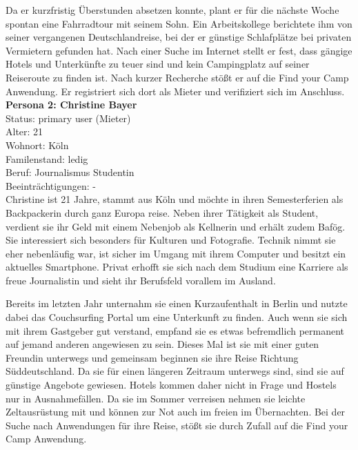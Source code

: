 Da er kurzfristig Überstunden absetzen konnte, plant er für die nächste Woche spontan eine Fahrradtour mit seinem Sohn. Ein Arbeitskollege berichtete ihm von seiner vergangenen Deutschlandreise, bei der er günstige Schlafplätze bei privaten Vermietern gefunden hat. Nach einer Suche im Internet stellt er fest, dass gängige Hotels und Unterkünfte zu teuer sind und kein Campingplatz auf seiner Reiseroute zu finden ist. Nach kurzer Recherche stößt er auf die Find your Camp Anwendung. Er registriert sich dort als Mieter und verifiziert sich im Anschluss.\\




\textbf{Persona 2: Christine Bayer }\\
Status: primary user (Mieter)\\

Alter: 21\\
Wohnort: Köln\\
Familenstand: ledig\\
Beruf: Journalismus Studentin\\
Beeinträchtigungen: - \\

Christine ist 21 Jahre, stammt aus Köln und möchte in ihren Semesterferien als Backpackerin durch ganz Europa reise.
Neben ihrer Tätigkeit als Student, verdient sie ihr Geld mit einem Nebenjob als Kellnerin und erhält zudem Bafög.
Sie interessiert sich besonders für Kulturen und Fotografie. Technik nimmt sie eher nebenläufig war, ist sicher im Umgang mit ihrem Computer und besitzt ein aktuelles Smartphone.
Privat erhofft sie sich nach dem Studium eine Karriere als freue Journalistin und sieht ihr Berufsfeld vorallem im Ausland.

Bereits im letzten Jahr unternahm sie einen Kurzaufenthalt in Berlin und nutzte dabei das Couchsurfing Portal um eine Unterkunft zu finden. Auch wenn sie sich mit ihrem Gastgeber gut verstand, empfand sie es etwas befremdlich permanent auf jemand anderen angewiesen zu sein. Dieses Mal ist sie mit einer guten Freundin unterwegs und gemeinsam beginnen sie ihre Reise Richtung Süddeutschland. Da sie für einen längeren Zeitraum unterwegs sind, sind sie auf günstige Angebote gewiesen. Hotels kommen daher nicht in Frage und Hostels nur in Ausnahmefällen. Da sie im Sommer verreisen nehmen sie leichte Zeltausrüstung mit und können zur Not auch im freien im Übernachten. Bei der Suche nach Anwendungen für ihre Reise, stößt sie durch Zufall auf die Find your Camp Anwendung.



